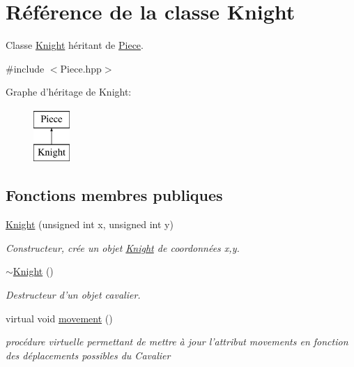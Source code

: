 \hypertarget{class_knight}{\section{Référence de la classe Knight}
\label{class_knight}
}


Classe \hyperlink{class_knight}{Knight} héritant de \hyperlink{class_piece}{Piece}.  




{\ttfamily \#include $<$Piece.\-hpp$>$}

Graphe d'héritage de Knight\-:\begin{figure}[H]
\begin{center}
\leavevmode
\includegraphics[height=2.000000cm]{class_knight}
\end{center}
\end{figure}
\subsection*{Fonctions membres publiques}
\begin{DoxyCompactItemize}
\item 
\hyperlink{class_knight_ae39d8e49ade7c0b66cf35dad69f2d2db}{Knight} (unsigned int x, unsigned int y)
\begin{DoxyCompactList}\small\item\em Constructeur, crée un objet \hyperlink{class_knight}{Knight} de coordonnées x,y. \end{DoxyCompactList}\item 
\hyperlink{class_knight_a2754123d6876babe915f4da8f761361b}{$\sim$\-Knight} ()
\begin{DoxyCompactList}\small\item\em Destructeur d'un objet cavalier. \end{DoxyCompactList}\item 
virtual void \hyperlink{class_knight_ab228b385a3154ecdc18fce4cc0df9cd6}{movement} ()
\begin{DoxyCompactList}\small\item\em procédure virtuelle permettant de mettre à jour l'attribut movements en fonction des déplacements possibles du Cavalier \end{DoxyCompactList}\end{DoxyCompactItemize}
